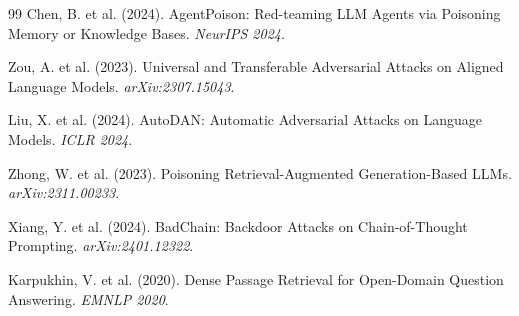 \documentclass{article}
\begin{document}
\begin{thebibliography}{99}
Chen, B. et al. (2024). AgentPoison: Red-teaming LLM Agents via Poisoning Memory or Knowledge Bases. \textit{NeurIPS 2024}.

Zou, A. et al. (2023). Universal and Transferable Adversarial Attacks on Aligned Language Models. \textit{arXiv:2307.15043}.

Liu, X. et al. (2024). AutoDAN: Automatic Adversarial Attacks on Language Models. \textit{ICLR 2024}.

Zhong, W. et al. (2023). Poisoning Retrieval-Augmented Generation-Based LLMs. \textit{arXiv:2311.00233}.

Xiang, Y. et al. (2024). BadChain: Backdoor Attacks on Chain-of-Thought Prompting. \textit{arXiv:2401.12322}.

Karpukhin, V. et al. (2020). Dense Passage Retrieval for Open-Domain Question Answering. \textit{EMNLP 2020}.
\end{thebibliography}
\end{document}
